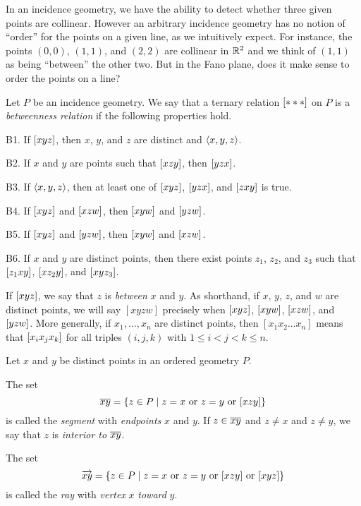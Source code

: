In an incidence geometry, we have the ability to detect whether three given points are collinear. However an arbitrary incidence geometry has no notion of ``order'' for the points on a given line, as we intuitively expect. For instance, the points $(0,0)$, $(1,1)$, and $(2,2)$ are collinear in $\mathbb{R}^2$ and we think of $(1,1)$ as being ``between'' the other two. But in the Fano plane, does it make sense to order the points on a line?

\begin{dfn}[Betweenness]
Let $P$ be an incidence geometry. We say that a ternary relation $[ \ast \ast \ast ]$ on $P$ is a \emph{betweenness relation} if the following properties hold.
\begin{proplist}
\item[B1.] If $[ x y z ]$, then $x$, $y$, and $z$ are distinct and $\langle x, y, z \rangle$.
\item[B2.] If $x$ and $y$ are points such that $[ x z y ]$, then $[ y z x ]$.
\item[B3.] If $\langle x, y, z \rangle$, then at least one of $[ x y z ]$, $[ y z x ]$, and $[ z x y ]$ is true.
\item[B4.] If $[ x y z ]$ and $[ x z w ]$, then $[ x y w ]$ and $[ y z w ]$.
\item[B5.] If $[ x y z ]$ and $[ y z w ]$, then $[ x y w ]$ and $[ x z w ]$.
\item[B6.] If $x$ and $y$ are distinct points, then there exist points $z_1$, $z_2$, and $z_3$ such that $[ z_1 x y ]$, $[ x z_2 y ]$, and $[ x y z_3 ]$.
\end{proplist}
\end{dfn}

If $[ x y z ]$, we say that $z$ is \emph{between} $x$ and $y$. As shorthand, if $x$, $y$, $z$, and $w$ are distinct points, we will say $[xyzw]$ precisely when $[ x y z ]$, $[ x y w ]$, $[ x z w ]$, and $[ y z w ]$. More generally, if $x_1, \ldots, x_n$ are distinct points, then $[x_1x_2 \ldots x_n]$ means that $[ x_i x_j x_k ]$ for all triples $(i,j,k)$ with $1 \leq i < j < k \leq n$.

\begin{dfn}
Let $x$ and $y$ be distinct points in an ordered geometry $P$.
\begin{proplist}
\item The set \[ \overline{xy} = \{ z \in P \mid z = x\ \mathrm{or}\ z = y\ \mathrm{or}\ [ x z y ] \} \] is called the \emph{segment} with \emph{endpoints} $x$ and $y$. If $z \in \overline{xy}$ and $z \neq x$ and $z \neq y$, we say that $z$ is \emph{interior to} $\overline{xy}$.
\item The set \[ \RAY{x}{y} = \{ z \in P \mid z = x\ \mathrm{or}\ z = y\ \mathrm{or}\ \BETWEEN{x}{z}{y}\ \mathrm{or}\ \BETWEEN{x}{y}{z} \} \] is called the \emph{ray} with \emph{vertex} $x$ \emph{toward} $y$.
\end{proplist}
\end{dfn}

